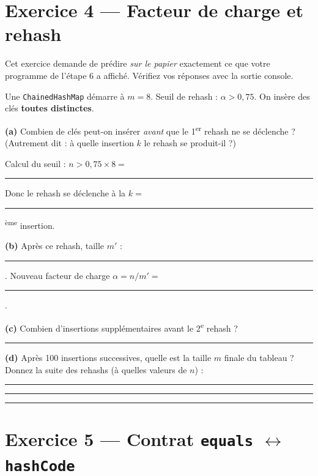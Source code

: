 \documentclass[11pt,a4paper]{article}
\begin{document}
\section{Exercice 4 --- Facteur de charge et rehash}

\begin{infobox}
Cet exercice demande de prédire \emph{sur le papier} exactement ce que votre programme de l'étape 6 a affiché. Vérifiez vos réponses avec la sortie console.
\end{infobox}

Une \texttt{ChainedHashMap} démarre à $m = 8$. Seuil de rehash : $\alpha > 0{,}75$. On insère des clés \textbf{toutes distinctes}.

\medskip

\textbf{(a)} Combien de clés peut-on insérer \emph{avant} que le 1\textsuperscript{er} rehash ne se déclenche ? (Autrement dit : à quelle insertion $k$ le rehash se produit-il ?)

\medskip

Calcul du seuil : $n > 0{,}75 \times 8 = $ \rule{2cm}{0.4pt}

\medskip

Donc le rehash se déclenche à la $k = $ \rule{2cm}{0.4pt} \textsuperscript{ème} insertion.

\medskip

\textbf{(b)} Après ce rehash, taille $m'$ : \rule{2cm}{0.4pt}. Nouveau facteur de charge $\alpha = n/m' = $ \rule{3cm}{0.4pt}.

\medskip

\textbf{(c)} Combien d'insertions supplémentaires avant le 2\textsuperscript{e} rehash ? \rule{2cm}{0.4pt}

\medskip

\textbf{(d)} Après 100 insertions successives, quelle est la taille $m$ finale du tableau ? Donnez la suite des rehashs (à quelles valeurs de $n$) :

\medskip
\rule{17cm}{0.4pt}

\vspace{0.3cm}
\rule{17cm}{0.4pt}

\vspace{0.3cm}
\rule{17cm}{0.4pt}

\section{Exercice 5 --- Contrat \texttt{equals} $\leftrightarrow$ \texttt{hashCode}}
\end{document}

